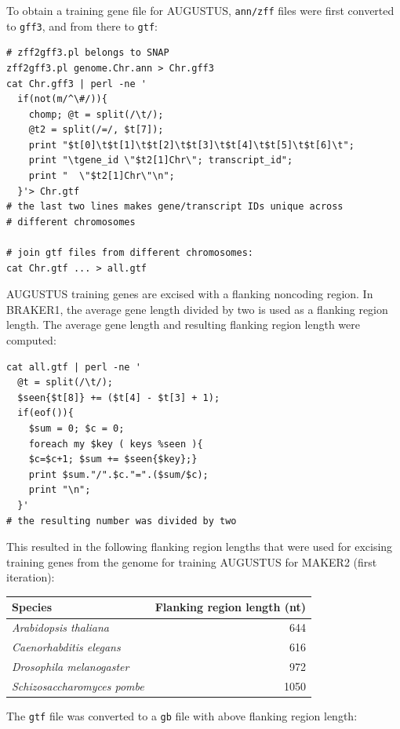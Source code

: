 \documentclass[a4paper,10pt]{report}
\begin{document}
\noindent To obtain a training gene file for AUGUSTUS, \texttt{ann/zff} files were first converted to \texttt{gff3}, and from there to \texttt{gtf}:

\begin{verbatim}
# zff2gff3.pl belongs to SNAP
zff2gff3.pl genome.Chr.ann > Chr.gff3
cat Chr.gff3 | perl -ne '
  if(not(m/^\#/)){
    chomp; @t = split(/\t/); 
    @t2 = split(/=/, $t[7]);
    print "$t[0]\t$t[1]\t$t[2]\t$t[3]\t$t[4]\t$t[5]\t$t[6]\t";
    print "\tgene_id \"$t2[1]Chr\"; transcript_id"; 
    print "  \"$t2[1]Chr\"\n";
  }'> Chr.gtf
# the last two lines makes gene/transcript IDs unique across 
# different chromosomes

# join gtf files from different chromosomes:
cat Chr.gtf ... > all.gtf
\end{verbatim}

\noindent AUGUSTUS training genes are excised with a flanking noncoding region. In BRAKER1, the average gene length divided by two is used as a flanking region length. The average gene length and resulting flanking region length were computed:

\begin{verbatim}
cat all.gtf | perl -ne '
  @t = split(/\t/);
  $seen{$t[8]} += ($t[4] - $t[3] + 1); 
  if(eof()){
    $sum = 0; $c = 0; 
    foreach my $key ( keys %seen ){
    $c=$c+1; $sum += $seen{$key};} 
    print $sum."/".$c."=".($sum/$c); 
    print "\n";
  }'
# the resulting number was divided by two
\end{verbatim}

\noindent This resulted in the following flanking region lengths that were used for excising training genes from the genome for training AUGUSTUS for MAKER2 (first iteration):\\

\begin{center}
\begin{tabular}{l r}
\hline
Species & Flanking region length (nt)\\
\hline
\textit{Arabidopsis thaliana} & 644\\
\textit{Caenorhabditis elegans} & 616\\
\textit{Drosophila melanogaster} & 972\\
\textit{Schizosaccharomyces pombe} & 1050\\
\hline
\end{tabular}
\end{center}

\noindent The \texttt{gtf} file was converted to a \texttt{gb} file with above flanking region length:\\
\end{document}
